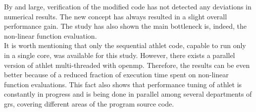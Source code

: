 By and large, verification of the modified code has not detected any deviations in numerical results. The new concept has always resulted in a slight overall performance gain. The study has also shown the main bottleneck is, indeed, the non-linear function evaluation.\\


It is worth mentioning that only the sequential \acrshort{athlet} code,  capable to run only in a single core, was available for this study. However, there exists a parallel version of \acrshort{athlet} multi-threaded with \acrshort{openmp}. Therefore, the results can be even better because of a reduced fraction of execution time spent on non-linear function evaluations. This fact also shows that performance tuning of \acrshort{athlet} is constantly in progress and is being done in parallel among several departments of \acrshort{grs}, covering different areas of the program source code.\\


